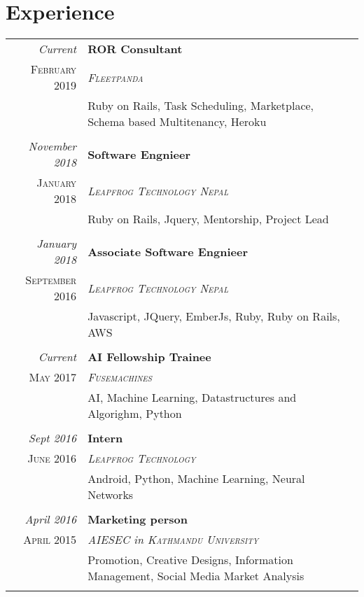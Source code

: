 \documentclass[a4paper,10pt]{article}
\begin{document}
\section{Experience}
\begin{tabular}{r|p{11cm}}
\emph{Current	} & \textbf{ROR Consultant}\\ \textsc{February 2019} & \emph{\textsc{Fleetpanda}} \\&\footnotesize{Ruby on Rails, Task Scheduling, Marketplace, Schema based Multitenancy, Heroku}\\\multicolumn{2}{c}{} \\
\emph{November 2018	} & \textbf{Software Engnieer}\\ \textsc{January 2018} & \emph{\textsc{Leapfrog Technology Nepal}} \\&\footnotesize{Ruby on Rails, Jquery, Mentorship, Project Lead}\\\multicolumn{2}{c}{} \\
\emph{January 2018} & \textbf{Associate Software Engnieer}\\ \textsc{September 2016} & \emph{\textsc{Leapfrog Technology Nepal}} \\&\footnotesize{Javascript, JQuery, EmberJs, Ruby, Ruby on Rails, AWS}\\\multicolumn{2}{c}{} \\
 \emph{Current} & \textbf{AI Fellowship Trainee}\\ \textsc{May 2017} & \emph{\textsc{Fusemachines}} \\&\footnotesize{AI, Machine Learning, Datastructures and Algorighm, Python}\\\multicolumn{2}{c}{} \\
 \emph{Sept 2016} & \textbf{Intern}\\ \textsc{June 2016} & \emph{\textsc{Leapfrog Technology}} \\&\footnotesize{Android, Python, Machine Learning, Neural Networks}\\\multicolumn{2}{c}{} \\
 \emph{April 2016} & \textbf{Marketing person}\\ \textsc{April 2015} & \emph{\textsc{AIESEC} in \textsc{Kathmandu University}} \\&\footnotesize{Promotion, Creative Designs, Information Management, Social Media Market Analysis}\\\multicolumn{2}{c}{} \\
\end{tabular}
\end{document}

